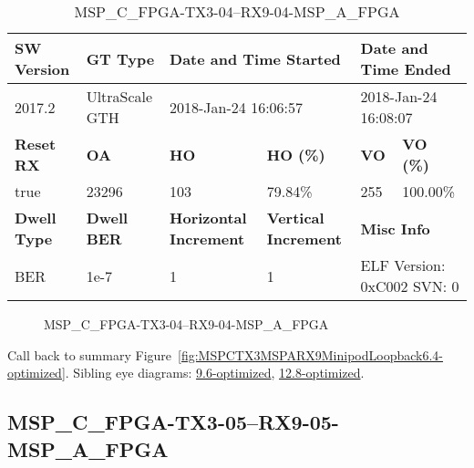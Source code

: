\begin{table}[h]
\centering
\caption{MSP\_C\_FPGA-TX3-04--RX9-04-MSP\_A\_FPGA}
\label{tab:MSPCFPGATX304RX904MSPAFPGA6.4-optimized}
\begin{tabular}{@{}|l|l|l|l|l|l|@{}}
\toprule
\textbf{SW Version}                & \textbf{GT Type}   & \multicolumn{2}{l|}{\textbf{Date and Time Started}}            & \multicolumn{2}{l|}{\textbf{Date and Time Ended}}        \\ \midrule
2017.2                       & UltraScale GTH          & \multicolumn{2}{l|}{2018-Jan-24 16:06:57}                   & \multicolumn{2}{l|}{2018-Jan-24 16:08:07}               \\ \midrule
\textbf{Reset RX}                  & \textbf{OA} & \textbf{HO}   & \textbf{HO (\%)} & \textbf{VO} & \textbf{VO (\%)} \\ \midrule
true & 23296        & 103          & 79.84\%        & 255        & 100.00\%       \\ \midrule
\textbf{Dwell Type}                & \textbf{Dwell BER} & \textbf{Horizontal Increment} & \textbf{Vertical Increment}    & \multicolumn{2}{l|}{\textbf{Misc Info}}                  \\ \midrule
BER                            & 1e-7        & 1        & 1           & \multicolumn{2}{l|}{ELF Version: 0xC002 SVN: 0}                         \\ \bottomrule
\end{tabular}
\end{table}

\begin{figure}[h]
\caption{MSP\_C\_FPGA-TX3-04--RX9-04-MSP\_A\_FPGA} \label{fig:MSPCFPGATX304RX904MSPAFPGA6.4-optimized}
\end{figure}

Call back to summary Figure~\ref{fig:MSPCTX3MSPARX9MinipodLoopback6.4-optimized}.
Sibling eye diagrams: \hyperref[sec:MSPCFPGATX304RX904MSPAFPGA9.6-optimized]{9.6-optimized}, \hyperref[sec:MSPCFPGATX304RX904MSPAFPGA12.8-optimized]{12.8-optimized}.

\clearpage
\newpage


\subsection{MSP\_C\_FPGA-TX3-05--RX9-05-MSP\_A\_FPGA}\label{sec:MSPCFPGATX305RX905MSPAFPGA6.4-optimized}

